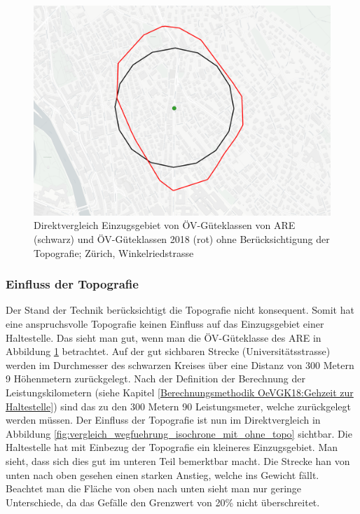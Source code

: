 \begin{figure}[ht]
    \centering
    \includegraphics[width=0.8\linewidth]{technicalreport/img/vergleich_wegfuehrung_are_isochrone}
    \caption[Direktvergleich Einzugsgebiet ARE und Isochrone]{Direktvergleich Einzugsgebiet von ÖV-Güteklassen von \ac{ARE} (schwarz) und ÖV-Güteklassen 2018 (rot) ohne Berücksichtigung der Topografie; Zürich, Winkelriedstrasse}
    \label{fig:vergleich_wegfuehrung_are_isochrone}
\end{figure}

\subsubsection{Einfluss der Topografie}

Der Stand der Technik berücksichtigt die Topografie nicht konsequent.
Somit hat eine anspruchsvolle Topografie keinen Einfluss auf das Einzugsgebiet einer Haltestelle.
Das sieht man gut, wenn man die ÖV-Güteklasse des \acl{ARE} in Abbildung \ref{fig:vergleich_wegfuehrung_are_isochrone} betrachtet.
Auf der gut sichbaren Strecke (Universitätsstrasse) werden im Durchmesser des schwarzen Kreises über eine Distanz von 300 Metern 9 Höhenmetern zurückgelegt.
Nach der Definition der Berechnung der Leistungskilometern (siehe Kapitel \ref{Berechnungsmethodik OeVGK18:Gehzeit zur Haltestelle}) sind das zu den 300 Metern 90 Leistungsmeter, welche zurückgelegt werden müssen.
Der Einfluss der Topografie ist nun im Direktvergleich in Abbildung \ref{fig:vergleich_wegfuehrung_isochrone_mit_ohne_topo} sichtbar.
Die Haltestelle hat mit Einbezug der Topografie ein kleineres Einzugsgebiet.
Man sieht, dass sich dies gut im unteren Teil bemerktbar macht.
Die Strecke han von unten nach oben gesehen einen starken Anstieg, welche ins Gewicht fällt.
Beachtet man die Fläche von oben nach unten sieht man nur geringe Unterschiede, da das Gefälle den Grenzwert von 20\% nicht überschreitet.

